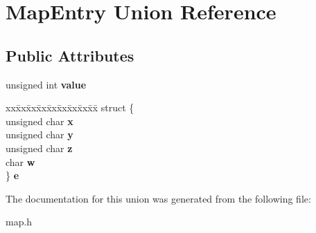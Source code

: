 \hypertarget{unionMapEntry}{}\section{Map\+Entry Union Reference}
\label{unionMapEntry}
\subsection*{Public Attributes}
\begin{DoxyCompactItemize}
\item 
\mbox{\label{unionMapEntry_a5dd4efdec12b49b1f2fe58aad41e8f50}} 
unsigned int {\bfseries value}
\item 
\mbox{\label{unionMapEntry_a278b4a881f536989cf29ee53535b7f98}} 
\begin{tabbing}
xx\=xx\=xx\=xx\=xx\=xx\=xx\=xx\=xx\=\kill
struct \{\\
\>unsigned char {\bfseries x}\\
\>unsigned char {\bfseries y}\\
\>unsigned char {\bfseries z}\\
\>char {\bfseries w}\\
\} {\bfseries e}\\

\end{tabbing}\end{DoxyCompactItemize}


The documentation for this union was generated from the following file\+:\begin{DoxyCompactItemize}
\item 
map.\+h\end{DoxyCompactItemize}
